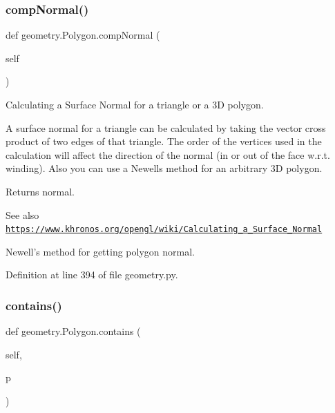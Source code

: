 \subsubsection{\texorpdfstring{comp\+Normal()}{compNormal()}}
{\footnotesize\ttfamily def geometry.\+Polygon.\+comp\+Normal (\begin{DoxyParamCaption}\item[{}]{self }\end{DoxyParamCaption})}



Calculating a Surface Normal for a triangle or a 3D polygon. 

A surface normal for a triangle can be calculated by taking the vector cross product of two edges of that triangle. The order of the vertices used in the calculation will affect the direction of the normal (in or out of the face w.\+r.\+t. winding). Also you can use a Newell\textquotesingle{}s method for an arbitrary 3D polygon.

\begin{DoxyReturn}{Returns}
normal. 
\end{DoxyReturn}
\begin{DoxySeeAlso}{See also}
\href{https://www.khronos.org/opengl/wiki/Calculating_a_Surface_Normal}{\tt https\+://www.\+khronos.\+org/opengl/wiki/\+Calculating\+\_\+a\+\_\+\+Surface\+\_\+\+Normal} \begin{DoxyVerb}Newell's method for getting polygon normal.\end{DoxyVerb}
 
\end{DoxySeeAlso}


Definition at line 394 of file geometry.\+py.

\mbox{\label{classgeometry_1_1Polygon_a64880abb26797d5ad564a6f0399b216c}} 
\subsubsection{\texorpdfstring{contains()}{contains()}}
{\footnotesize\ttfamily def geometry.\+Polygon.\+contains (\begin{DoxyParamCaption}\item[{}]{self,  }\item[{}]{p }\end{DoxyParamCaption})}

